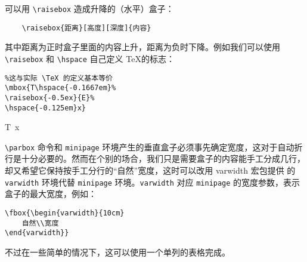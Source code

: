 可以用 \verb|\raisebox| 造成升降的（水平）盒子：
\begin{lstlisting}
    \raisebox{距离}[高度][深度]{内容}
\end{lstlisting}

其中距离为正时盒子里面的内容上升，距离为负时下降。例如我们可以使用 \verb|\raisebox|
和 \verb|\hspace| 自己定义 \TeX 的标志：

\begin{minipage}[t]{0.45\textwidth}
\begin{lstlisting}
%这与实际 \TeX 的定义基本等价
\mbox{T\hspace{-0.1667em}%
\raisebox{-0.5ex}{E}%
\hspace{-0.125em}x}
\end{lstlisting}
\end{minipage}
\hfill
\begin{minipage}[t]{0.45\textwidth}
\mbox{T\hspace{-0.1667em}%
\raisebox{-0.5ex}{E}%
\hspace{-0.125em}x}
\end{minipage}

\verb|\parbox| 命令和 \verb|minipage| 环境产生的垂直盒子必须事先确定宽度，这对于自动折行是十分必要的。然而在个别的场合，我们只是需要盒子的内容能手工分成几行，却又希望它保持按手工分行的“自然”宽度，这时可以改用 varwidth 宏包提供
的 \verb|varwidth| 环境代替 \verb|minipage| 环境。\verb|varwidth| 对应 \verb|minipage| 的宽度参数，表示盒子的最大宽度，例如：

\begin{minipage}[t]{0.45\textwidth}
\begin{lstlisting}
\fbox{\begin{varwidth}{10cm}
    自然\\宽度
\end{varwidth}}
\end{lstlisting}
\end{minipage}
\hfill
\begin{minipage}[t]{0.45\textwidth}
\end{minipage}

不过在一些简单的情况下，这可以使用一个单列的表格完成。

